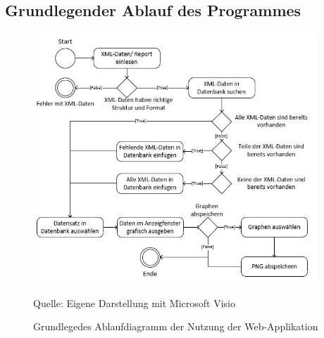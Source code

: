 \subsection{Grundlegender Ablauf des Programmes}
\label{subsec:grundlegender-ablauf-des-programmes}

\begin{figure}[H]
    \centering
    \includegraphics[width=0.95\textwidth]{Grafiken/Ablaufdiagramm}
    \caption{Grundlegedes Ablaufdiagramm der Nutzung der Web-Applikation}
    \label{fig: Grundlegedes Ablaufdiagramm der Nutzung der Web-Applikation}
    {Quelle: Eigene Darstellung mit Microsoft Visio}
\end{figure}